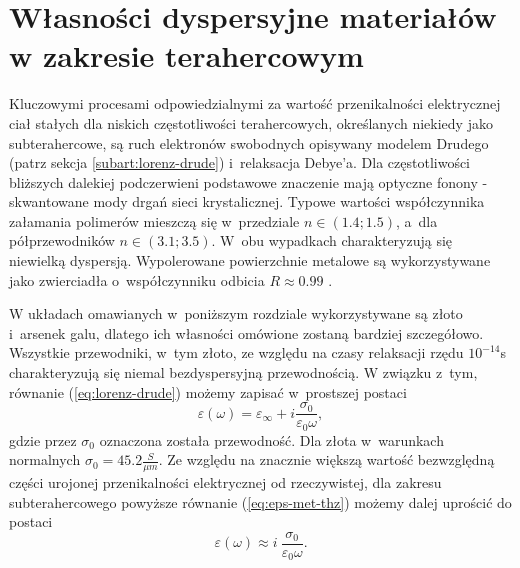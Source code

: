 \section{Własności dyspersyjne materiałów w zakresie terahercowym}
\label{subart:thzmat}
Kluczowymi procesami odpowiedzialnymi za wartość przenikalności elektrycznej ciał stałych dla niskich częstotliwości terahercowych, określanych niekiedy jako subterahercowe, są ruch elektronów swobodnych opisywany modelem Drudego (patrz sekcja \ref{subart:lorenz-drude}) i~relaksacja Debye'a. Dla częstotliwości bliższych dalekiej podczerwieni podstawowe znaczenie mają optyczne fonony - skwantowane mody drgań sieci krystalicznej. Typowe wartości współczynnika załamania polimerów mieszczą się w~przedziale $n \in (1.4;1.5)$, a~dla półprzewodników $n\in (3.1;3.5)$. W~obu wypadkach charakteryzują się niewielką dyspersją. Wypolerowane powierzchnie metalowe są wykorzystywane jako zwierciadła o~współczynniku odbicia $R\approx 0.99$ \cite{lee2009principles}.

W układach omawianych w~poniższym rozdziale wykorzystywane są złoto i~arsenek galu, dlatego ich własności omówione zostaną bardziej szczegółowo. Wszystkie przewodniki, w~tym złoto, ze względu na czasy relaksacji rzędu $10^{-14}$s charakteryzują się niemal bezdyspersyjną przewodnością. W związku z~tym, równanie (\ref{eq:lorenz-drude}) możemy zapisać w~prostszej postaci
\begin{equation}
	\varepsilon(\omega)=\varepsilon_{\infty}+i \frac{\sigma_0}{\varepsilon_0 \omega},
	\label{eq:eps-met-thz}
\end{equation}
gdzie przez $\sigma_0$ oznaczona została przewodność. Dla złota w~warunkach normalnych $\sigma_0=45.2 \frac{S}{\mu m}$.   Ze względu na znacznie większą wartość bezwzględną części urojonej przenikalności elektrycznej od rzeczywistej, dla zakresu subterahercowego powyższe równanie (\ref{eq:eps-met-thz}) możemy dalej uprościć do postaci
\begin{equation}
	\varepsilon(\omega) \approx i~\frac{\sigma_0}{\varepsilon_0 \omega}.
	\label{eq:eps-met-thz-app}
\end{equation}

